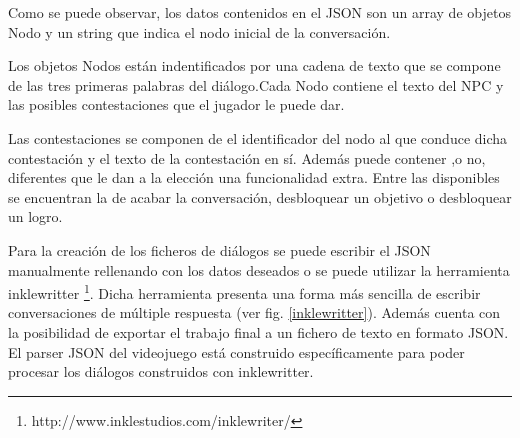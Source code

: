 Como se puede observar, los datos contenidos en el JSON son un array de objetos Nodo y un string que indica el nodo inicial de la conversación. 

Los objetos Nodos están indentificados por una cadena de texto que se compone de las tres primeras palabras del diálogo.Cada Nodo contiene el texto del NPC y las posibles contestaciones que el jugador le puede dar.

Las contestaciones se componen de el identificador del nodo al que conduce dicha contestación y el texto de la contestación en sí. Además puede contener ,o no, diferentes  que le dan a la elección una funcionalidad extra. Entre las  disponibles se encuentran la de acabar la conversación, desbloquear un objetivo o desbloquear un logro.

Para la creación de los ficheros de diálogos se puede escribir el JSON manualmente rellenando con los datos deseados o se puede utilizar la herramienta inklewritter \footnote{http://www.inklestudios.com/inklewriter/}. Dicha herramienta presenta una forma más sencilla de escribir conversaciones de múltiple respuesta (ver fig. \ref{inklewritter}). Además cuenta con la posibilidad de exportar el trabajo final a un fichero de texto en formato JSON. El parser JSON del videojuego está construido específicamente para poder procesar los diálogos construidos con inklewritter.

